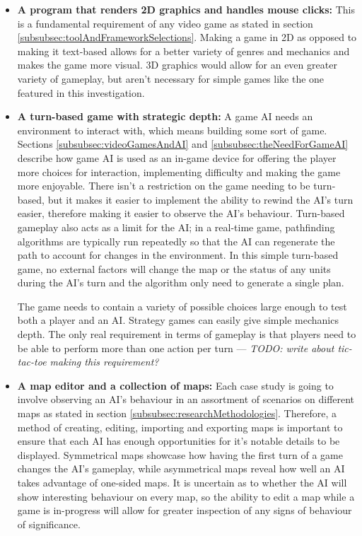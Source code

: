 \documentclass[11pt, a4paper]{article}
\begin{document}
\begin{itemize}

\item \textbf{A program that renders 2D graphics and handles mouse clicks:}
This is a fundamental requirement of any video game as stated in section \ref{subsubsec:toolAndFrameworkSelections}. Making a game in 2D as opposed to making it text-based allows for a better variety of genres and mechanics and makes the game more visual. 3D graphics would allow for an even greater variety of gameplay, but aren't necessary for simple games like the one featured in this investigation.

\item \textbf{A turn-based game with strategic depth:}
A game AI needs an environment to interact with, which means building some sort of game. Sections \ref{subsubsec:videoGamesAndAI} and \ref{subsubsec:theNeedForGameAI} describe how game AI is used as an in-game device for offering the player more choices for interaction, implementing difficulty and making the game more enjoyable. There isn't a restriction on the game needing to be turn-based, but it makes it easier to implement the ability to rewind the AI's turn easier, therefore making it easier to observe the AI's behaviour. Turn-based gameplay also acts as a limit for the AI; in a real-time game, pathfinding algorithms are typically run repeatedly so that the AI can regenerate the path to account for changes in the environment. In this simple turn-based game, no external factors will change the map or the status of any units during the AI's turn and the algorithm only need to generate a single plan.

The game needs to contain a variety of possible choices large enough to test both a player and an AI. Strategy games can easily give simple mechanics depth. The only real requirement in terms of gameplay is that players need to be able to perform more than one action per turn --- \emph{TODO: write about tic-tac-toe making this requirement?}

\item \textbf{A map editor and a collection of maps:}
Each case study is going to involve observing an AI's behaviour in an assortment of scenarios on different maps as stated in section \ref{subsubsec:researchMethodologies}. Therefore, a method of creating, editing, importing and exporting maps is important to ensure that each AI has enough opportunities for it's notable details to be displayed. Symmetrical maps showcase how having the first turn of a game changes the AI's gameplay, while asymmetrical maps reveal how well an AI takes advantage of one-sided maps. It is uncertain as to whether the AI will show interesting behaviour on every map, so the ability to edit a map while a game is in-progress will allow for greater inspection of any signs of behaviour of significance.


\end{itemize}
\end{document}
